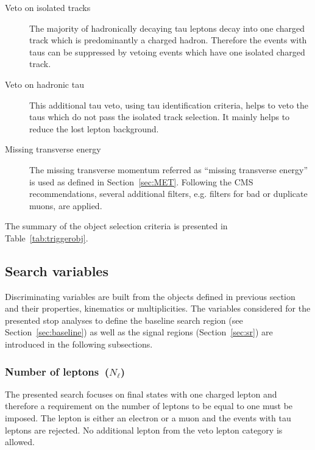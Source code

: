 \begin{description}
\item[Veto on isolated tracks]
The majority of hadronically decaying tau leptons decay into one charged track which is predominantly a charged hadron. Therefore the events with taus can be suppressed by vetoing events which have one isolated charged track.

\item[Veto on hadronic tau]
This additional tau veto, using tau identification criteria, helps to veto the taus which do not pass the isolated track selection. It mainly helps to reduce the lost lepton background.

\item[Missing transverse energy]
The missing transverse momentum referred as ``missing transverse energy'' is used as defined in Section~\ref{sec:MET}. Following the CMS recommendations, several additional \MET filters, e.g. filters for bad or duplicate muons, are applied.   
\end{description}

The summary of the object selection criteria is presented in Table~\ref{tab:triggerobj}.

\subsection{Search variables~\label{sec:variables}}

Discriminating variables are built from the objects defined in previous section and their properties, kinematics or multiplicities. The variables considered for the presented stop analyses to define the baseline search region (see Section~\ref{sec:baseline}) as well as the signal regions (Section~\ref{sec:sr}) are introduced in the following subsections.

\subsubsection{Number of leptons~($N_{\ell}$)}

The presented search focuses on final states with one charged lepton and therefore a requirement on the number of leptons to be equal to one must be imposed. The lepton is either an electron or a muon and the events with tau leptons are rejected. No additional lepton from the veto lepton category is allowed.

